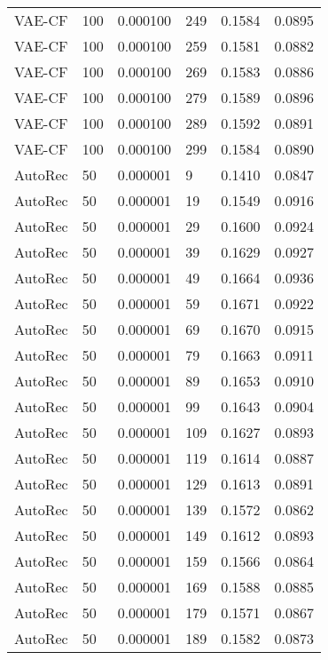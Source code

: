 \begin{tabular}{llrlrr}
  VAE-CF &  100 &  0.000100 &   249 &  0.1584 &       0.0895 \\
  VAE-CF &  100 &  0.000100 &   259 &  0.1581 &       0.0882 \\
  VAE-CF &  100 &  0.000100 &   269 &  0.1583 &       0.0886 \\
  VAE-CF &  100 &  0.000100 &   279 &  0.1589 &       0.0896 \\
  VAE-CF &  100 &  0.000100 &   289 &  0.1592 &       0.0891 \\
  VAE-CF &  100 &  0.000100 &   299 &  0.1584 &       0.0890 \\
 AutoRec &   50 &  0.000001 &     9 &  0.1410 &       0.0847 \\
 AutoRec &   50 &  0.000001 &    19 &  0.1549 &       0.0916 \\
 AutoRec &   50 &  0.000001 &    29 &  0.1600 &       0.0924 \\
 AutoRec &   50 &  0.000001 &    39 &  0.1629 &       0.0927 \\
 AutoRec &   50 &  0.000001 &    49 &  0.1664 &       0.0936 \\
 AutoRec &   50 &  0.000001 &    59 &  0.1671 &       0.0922 \\
 AutoRec &   50 &  0.000001 &    69 &  0.1670 &       0.0915 \\
 AutoRec &   50 &  0.000001 &    79 &  0.1663 &       0.0911 \\
 AutoRec &   50 &  0.000001 &    89 &  0.1653 &       0.0910 \\
 AutoRec &   50 &  0.000001 &    99 &  0.1643 &       0.0904 \\
 AutoRec &   50 &  0.000001 &   109 &  0.1627 &       0.0893 \\
 AutoRec &   50 &  0.000001 &   119 &  0.1614 &       0.0887 \\
 AutoRec &   50 &  0.000001 &   129 &  0.1613 &       0.0891 \\
 AutoRec &   50 &  0.000001 &   139 &  0.1572 &       0.0862 \\
 AutoRec &   50 &  0.000001 &   149 &  0.1612 &       0.0893 \\
 AutoRec &   50 &  0.000001 &   159 &  0.1566 &       0.0864 \\
 AutoRec &   50 &  0.000001 &   169 &  0.1588 &       0.0885 \\
 AutoRec &   50 &  0.000001 &   179 &  0.1571 &       0.0867 \\
 AutoRec &   50 &  0.000001 &   189 &  0.1582 &       0.0873 \\

\end{tabular}
